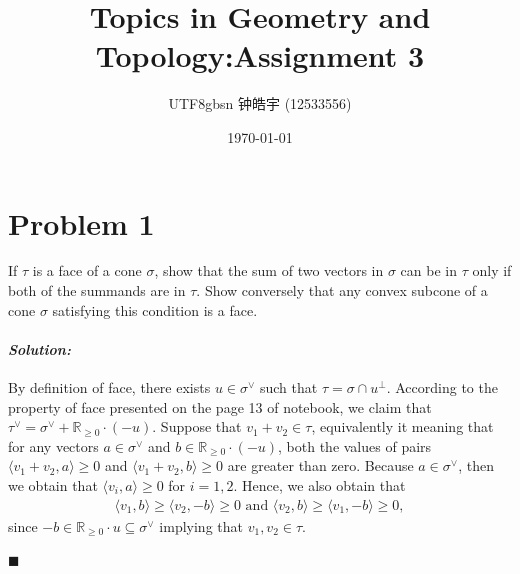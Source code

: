 \documentclass[12pt, a4paper]{article}
\title{Topics in Geometry and Topology:Assignment 3}
\author{
    \begin{CJK*}{UTF8}{gbsn}
    钟皓宇 (12533556)
    \end{CJK*}
}
\date{\today}
\newenvironment{solution}
  {\paragraph{\textit{Solution:}}\par\medskip}
  {\hfill$\blacksquare$\vspace{0.1cm}}
\begin{document}
\maketitle
\section*{Problem 1}
If $\tau$ is a face of a cone $\sigma$, show that the sum of two vectors in $\sigma$ can be in $\tau$ only if both of the summands are in $\tau$. Show conversely that any convex subcone of a cone $\sigma$ satisfying this condition is a face.

\begin{solution}
By definition of face, there exists $u\in \sigma^\vee$ such that $\tau= \sigma\cap u^\perp$. According to the property of face presented on the page 13 of notebook, 
we claim that $\tau^\vee = \sigma^\vee+\mathbb{R}_{\ge 0}\cdot(-u)$. Suppose that $v_1+v_2\in\tau$, equivalently it meaning that 
for any vectors $a\in \sigma^\vee$ and $b\in \mathbb{R}_{\ge 0}\cdot(-u)$, both the values of pairs $\langle v_1+v_2,a \rangle\ge 0$ and $\langle v_1+v_2,b \rangle\ge 0$ are greater than zero.
Because $a\in\sigma^\vee$, then we obtain that $\langle v_i,a\rangle\ge 0$ for $i=1,2$. Hence, we also obtain that 
\begin{align*}
    \langle v_1,b\rangle  \ge \langle v_2,-b\rangle\ge 0
    \text{ and }
    \langle v_2,b\rangle  \ge \langle v_1,-b\rangle\ge 0,
\end{align*}
since $-b\in \mathbb{R}_{\ge 0}\cdot u \subseteq \sigma^\vee$ implying that $v_1,v_2\in \tau$.


\end{solution}
\end{document}
